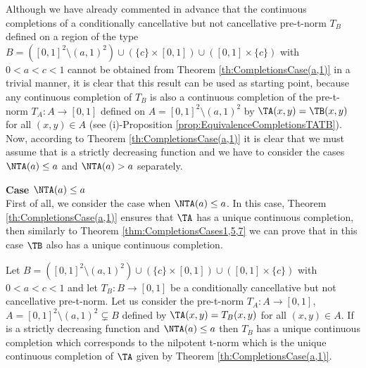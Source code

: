 Although we have already commented in advance that the continuous completions of a conditionally cancellative but not cancellative pre-t-norm $T_B$ defined on a region of the type $B=([0,1]^2 \setminus (a,1)^2) \cup (\{c\} \times [0,1]) \cup ([0,1] \times \{c\})$ with $0<a<c<1$ cannot be obtained from Theorem \ref{th:CompletionsCase(a,1)} in a trivial manner, it is clear that this result can be used as starting point, because any continuous completion of $T_B$ is also a continuous completion of the pre-t-norm $T_A:A \to [0,1]$ defined on $A=[0,1]^2 \setminus (a,1)^2$ by $\TA(x,y)=\TB(x,y)$ for all $(x,y) \in A$ (see (i)-Proposition \ref{prop:EquivalenceCompletionsTATB}). Now, according to Theorem \ref{th:CompletionsCase(a,1)} it is clear that we must assume that \NTA is a strictly decreasing function and we have to consider the cases $\NTA(a) \leq a$ and $\NTA(a)>a$ separately.

\pagebreak

\noindent \textbf{Case $\NTA(a) \leq a$}\\

First of all, we consider the case when $\NTA(a) \leq a$. In this case, Theorem \ref{th:CompletionsCase(a,1)} ensures that $\TA$ has a unique continuous completion, then similarly to Theorem \ref{thm:CompletionsCases1,5,7} we can prove that  in this case $\TB$ also has a unique continuous completion.

\begin{theorem}\label{thm:Case6NTA(a)<=a}
	Let $B=([0,1]^2 \setminus (a,1)^2) \cup (\{c\} \times [0,1]) \cup ([0,1] \times \{c\})$ with $0<a<c<1$ and let $T_B : B \to [0,1]$ be a conditionally cancellative but not cancellative pre-t-norm. Let us consider the pre-t-norm $T_A : A \to [0,1]$, $A = [0,1]^2 \setminus (a,1)^2 \subsetneq B$ defined by $\TA(x,y)=T_B(x,y)$ for all $(x,y) \in A$. If \NTA is a strictly decreasing function and $\NTA(a) \leq a$ then $T_B$ has a unique continuous completion which corresponds to the nilpotent t-norm which is the unique continuous completion of $\TA$ given by Theorem \ref{th:CompletionsCase(a,1)}.
\end{theorem}

